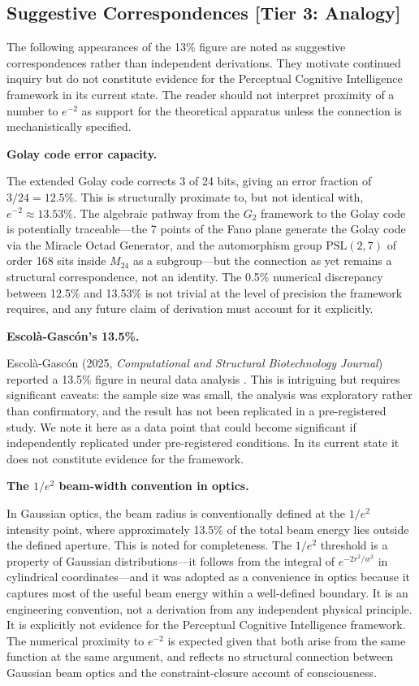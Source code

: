 \documentclass[12pt,a4paper]{article}
\begin{document}
\subsection{Suggestive Correspondences [Tier 3: Analogy]}

The following appearances of the 13\% figure are noted as suggestive correspondences rather than independent derivations. They motivate continued inquiry but do not constitute evidence for the Perceptual Cognitive Intelligence framework in its current state. The reader should not interpret proximity of a number to $e^{-2}$ as support for the theoretical apparatus unless the connection is mechanistically specified.

\textbf{Golay code error capacity.}

The extended Golay code corrects 3 of 24 bits, giving an error fraction of $3/24 = 12.5\%$. This is structurally proximate to, but not identical with, $e^{-2} \approx 13.53\%$. The algebraic pathway from the $G_2$ framework to the Golay code is potentially traceable---the 7 points of the Fano plane generate the Golay code via the Miracle Octad Generator, and the automorphism group $\mathrm{PSL}(2,7)$ of order 168 sits inside $M_{24}$ as a subgroup---but the connection as yet remains a structural correspondence, not an identity. The 0.5\% numerical discrepancy between 12.5\% and 13.53\% is not trivial at the level of precision the framework requires, and any future claim of derivation must account for it explicitly.

\textbf{Escol\`a-Gasc\'on's 13.5\%.}

Escol\`a-Gasc\'on (2025, \textit{Computational and Structural Biotechnology Journal}) reported a 13.5\% figure in neural data analysis \citep{EscolaGascon2025}. This is intriguing but requires significant caveats: the sample size was small, the analysis was exploratory rather than confirmatory, and the result has not been replicated in a pre-registered study. We note it here as a data point that could become significant if independently replicated under pre-registered conditions. In its current state it does not constitute evidence for the framework.

\textbf{The $1/e^2$ beam-width convention in optics.}

In Gaussian optics, the beam radius is conventionally defined at the $1/e^2$ intensity point, where approximately 13.5\% of the total beam energy lies outside the defined aperture. This is noted for completeness. The $1/e^2$ threshold is a property of Gaussian distributions---it follows from the integral of $e^{-2r^2/w^2}$ in cylindrical coordinates---and it was adopted as a convenience in optics because it captures most of the useful beam energy within a well-defined boundary. It is an engineering convention, not a derivation from any independent physical principle. It is explicitly not evidence for the Perceptual Cognitive Intelligence framework. The numerical proximity to $e^{-2}$ is expected given that both arise from the same function at the same argument, and reflects no structural connection between Gaussian beam optics and the constraint-closure account of consciousness.
\end{document}
